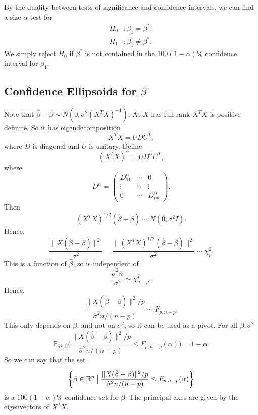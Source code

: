 \documentclass[12pt]{article}
\begin{document}
By the duality between tests of significance and confidence intervals, we can find a size $\alpha$ test for
\begin{align*}
	H_0 &: \beta_1 = \beta^{\ast}, \\
	H_1 &: \beta_1 \neq \beta^{\ast}.
\end{align*}
We simply reject $H_0$ if $\beta^{\ast}$ is not contained in the $100(1-\alpha)$\% confidence interval for $\beta_1$.

\subsection{Confidence Ellipsoids for \texorpdfstring{$\beta$}{Beta}}
\label{sub:confidence_ellipsoids_for_beta}

Note that $\hat \beta - \beta \sim N(0, \sigma^2(X^{T}X)^{-1})$. As $X$ has full rank $X^{T}X$ is positive definite. So it has eigendecomposition
\[
X^{T}X = U D U^{T},
\]
where $D$ is diagonal and $U$ is unitary. Define
\[
	(X^{T}X)^{\alpha} = U D^{\alpha} U^{T},
\]
where
\[
D^{\alpha} =
\begin{pmatrix}
	D_{11}^{\alpha} & \cdots & 0 \\
			\vdots & \ddots & \vdots \\
			0 & \cdots & D_{pp}^{\alpha}
\end{pmatrix}.
\]
Then
\[
	(X^{T}X)^{1/2}(\hat \beta - \beta) \sim N(0, \sigma^2 I).
\]
Hence,
\[
\frac{\|X(\hat \beta - \beta)\|^2}{\sigma^2} = \frac{\|(X^{T}X)^{1/2}(\hat \beta - \beta)\|^2}{\sigma^2} \sim \chi^2_{p}.
\]
This is a function of $\hat \beta$, so is independent of
\[
\frac{\hat \sigma^2 n}{\sigma^2} \sim \chi^2_{n-p}.
\]
Hence,
\[
\frac{\|X(\hat \beta - \beta)\|^2/p}{\hat \sigma^2 n/(n-p)} \sim F_{p, n-p}.
\]
This only depends on $\beta$, and not on $\sigma^2$, so it can be used as a pivot. For all $\beta, \sigma^2$
\[
\mathbb{P}_{\sigma^2, \beta} \biggl( \frac{\|X(\hat \beta - \beta)\|^2/p}{\hat \sigma^2 n/(n-p)} \leq F_{p,n-p}(\alpha) \biggr) = 1 - \alpha.
\]
So we can say that the set
\[
	\biggl\{\beta \in \mathbb{R}^{p} \bigm| \frac{\|X(\hat \beta - \beta)\|^2/p}{\hat \sigma^2 n/(n-p)} \leq F_{p,n-p}(\alpha) \biggr\}
\]
is a $100(1 - \alpha)$\% confidence set for $\beta$. The principal axes are given by the eigenvectors of $X^{T}X$.

\newpage

\printindex
\end{document}
